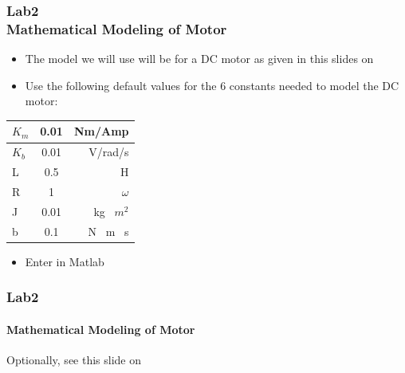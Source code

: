 \documentclass[hyperref={pdfpagelabels=true}]{beamer}
\begin{document}
\begin{frame}
\frametitle{Lab2 \\{\large Mathematical Modeling of Motor}}
\begin{itemize}
\item The model we will use will be for a DC motor as given
in this slides on \hyperlink{motor}{}
\item Use the following default values for the 6 constants needed to
model the DC motor:
\end{itemize}
\begin{center}
  \begin{tabular}{ | l | c | r |}

    \hline
   $K_m$ & 0.01 & Nm/Amp \\ \hline
    $K_b$ & 0.01 & V/rad/s \\ \hline 
    L & 0.5 & H \\ \hline
    R & 1 & $\omega$ \\ \hline
J & 0.01 &kg \ $m^2$ \\ \hline
b &0.1 &N \ m \ s \\
    \hline
  \end{tabular}
\end{center}

\begin{itemize}
\item Enter in Matlab
\end{itemize}

\label{motor1}
\end{frame}

\begin{frame}
\frametitle{Lab2}
\framesubtitle{Mathematical Modeling of Motor}
\begin{tcolorbox}[title=  ,width=9.85 cm]


\end{tcolorbox}
Optionally, see this slide on \hyperlink{step}{}
\label{what}
\end{frame}
\end{document}
